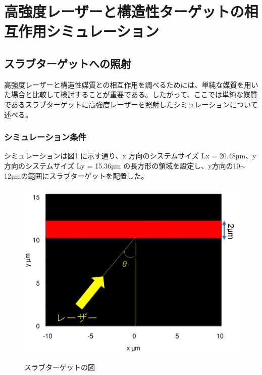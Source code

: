 \documentclass[a4paper,11pt,titlepage]{jarticle}
\numberwithin{equation}{section} %
\begin{document}
\newpage
  

\section{高強度レーザーと構造性ターゲットの相互作用シミュレーション}

\subsection{スラブターゲットへの照射}
高強度レーザーと構造性媒質との相互作用を調べるためには、単純な媒質を用いた場合と比較して検討することが重要である。したがって、ここでは単純な媒質であるスラブターゲットに高強度レーザーを照射したシミュレーションについて述べる。

\subsubsection{シミュレーション条件}
シミュレーションは図1 に示す通り、x 方向のシステムサイズ Lx = 20.48µm、y 方向のシステムサイズ Ly = 15.36µm の長方形の領域を設定し、y方向の10$\sim$12µmの範囲にスラブターゲットを配置した。

\begin{figure}[H]
  \begin{center}
    \includegraphics[scale=0.4]{./image/4-1-slab.png}
    \label{fig:4-1}
    \caption{スラブターゲットの図}
  \end{center}
\end{figure}
\end{document}

